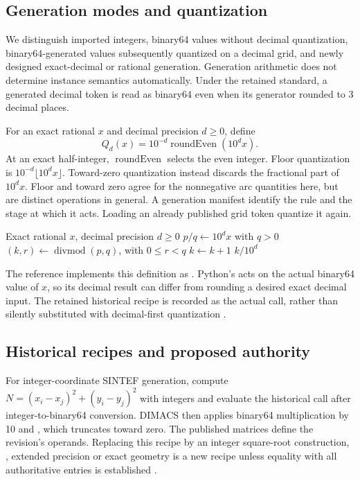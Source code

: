 \subsection{Generation modes and quantization}
We distinguish imported integers, binary64 values without decimal quantization, binary64-generated values subsequently quantized on a decimal grid, and newly designed exact-decimal or rational generation. Generation arithmetic does not determine instance semantics automatically. Under the retained standard, a generated decimal token is read as binary64 even when its generator rounded to 3 decimal places.

For an exact rational $x$ and decimal precision $d\geq0$, define
\[
Q_d(x)=10^{-d}\operatorname{roundEven}(10^d x).
\]
At an exact half-integer, $\operatorname{roundEven}$ selects the even integer. Floor quantization is $10^{-d}\lfloor10^d x\rfloor$. Toward-zero quantization instead discards the fractional part of $10^d x$. Floor and toward zero agree for the nonnegative arc quantities here, but are distinct operations in general. A generation manifest \must{} identify the rule and the stage at which it acts. Loading an already published grid token \mustnot{} quantize it again.

\begin{algorithm}[htbp]
\caption{Exact decimal-grid quantization}
\begin{algorithmic}[1]
\Require Exact rational $x$, decimal precision $d\geq0$
\State $p/q\gets 10^d x$ with $q>0$
\State $(k,r)\gets\operatorname{divmod}(p,q)$, with $0\leq r<q$
\State $k\gets k+1$
\EndIf
\State \Return $k/10^d$
\end{algorithmic}
\end{algorithm}

The reference implements this definition as . Python's  acts on the actual binary64 value of $x$, so its decimal result can differ from rounding a desired exact decimal input. The retained historical recipe is recorded as the actual call, rather than silently substituted with decimal-first quantization \autocite{pythonRound2026}.

\subsection{Historical recipes and proposed authority}
For integer-coordinate SINTEF generation, compute $N=(x_i-x_j)^2+(y_i-y_j)^2$ with integers and evaluate the historical  call after integer-to-binary64 conversion. DIMACS then applies binary64 multiplication by 10 and , which truncates toward zero. The published matrices define the revision's operands. Replacing this recipe by an integer square-root construction, , extended precision or exact geometry is a new recipe unless equality with all authoritative entries is established \autocite{onyrStaticStorageAudit2026,onyrSintefAudit2026}.

